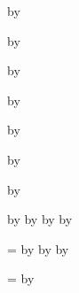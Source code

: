 \newcount\CoauthorE
{}
\advance\CoauthorCitations by \CoauthorE



\newcount\CollaboratorCitations
{}

\newcount\CollaboratorA
{}
\advance\CollaboratorCitations by \CollaboratorA

\newcount\CollaboratorB
{}
\advance\CollaboratorCitations by \CollaboratorB

\newcount\CollaboratorC
{}
\advance\CollaboratorCitations by \CollaboratorC

\newcount\CollaboratorD
{}
\advance\CollaboratorCitations by \CollaboratorD

\newcount\CollaboratorE
{}
\advance\CollaboratorCitations by \CollaboratorE

\newcount\CollaboratorF
{}
\advance\CollaboratorCitations by \CollaboratorF



\newcount\TotalCitations
{}

\advance\TotalCitations by \FirstAuthorCitations
\advance\TotalCitations by \StudentAuthorCitations
\advance\TotalCitations by \CoauthorCitations
\advance\TotalCitations by \CollaboratorCitations


\newcount\FirstAuthorPublications
{}

\newcount\StudentPublications
{}

\newcount\CoauthorPublications
{}

\newcount\CollaborativePublications
{}

\newcount\AllPublications
\AllPublications=\FirstAuthorPublications
\advance\AllPublications by \StudentPublications
\advance\AllPublications by \CoauthorPublications
\advance\AllPublications by \CollaborativePublications

\newcount\AllCollaborativePublications
\AllCollaborativePublications=\CoauthorPublications
\advance\AllCollaborativePublications by \CollaborativePublications
